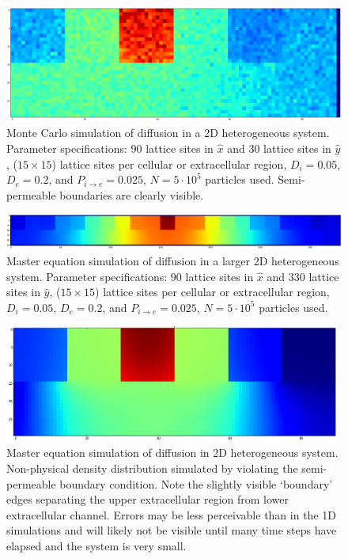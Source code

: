 	\begin{figure}[h!]
		\centering
		\includegraphics[width=1.0\linewidth]{../images/2D/MC_heterogeneous_3U_2D}
		\caption{Monte Carlo simulation of diffusion in a 2D heterogeneous system. Parameter specifications: 90 lattice sites in $ \hat{x} $ and 30 lattice sites in $ \hat{y} $, ($ 15 \times 15 $) lattice sites per cellular or extracellular region, $ D_i = 0.05 $, $ D_e = 0.2 $, and $ P_{i\rightarrow e} = 0.025 $, $ N = 5 \cdot 10^5 $ particles used. Semi-permeable boundaries are clearly visible.}
		\label{fig:MC_heterogeneous_3U_2D}
	\end{figure}
	
	\begin{figure}[h!]
		\centering
		\includegraphics[width=1.0\linewidth]{../images/2D/heterogeneous_11U_2D}
		\caption{Master equation simulation of diffusion in a larger 2D heterogeneous system. Parameter specifications: 90 lattice sites in $ \hat{x} $ and 330 lattice sites in $ \hat{y} $, ($ 15 \times 15 $) lattice sites per cellular or extracellular region, $ D_i = 0.05 $, $ D_e = 0.2 $, and $ P_{i\rightarrow e} = 0.025 $, $ N = 5 \cdot 10^5 $ particles used.}
		\label{fig:heterogeneous_11U_2D}
	\end{figure}
	
	\begin{figure}[h!]
		\centering
		\includegraphics[width=1.0\linewidth]{../images/2D/error_in_diffusion}
		\caption{Master equation simulation of diffusion in 2D heterogeneous system. Non-physical density distribution simulated by violating the semi-permeable boundary condition. Note the slightly visible `boundary' edges separating the upper extracellular region from lower extracellular channel. Errors may be less perceivable than in the 1D simulations and will likely not be visible until many time steps have elapsed and the system is very small.}
		\label{fig:error_in_diffusion}
	\end{figure}

